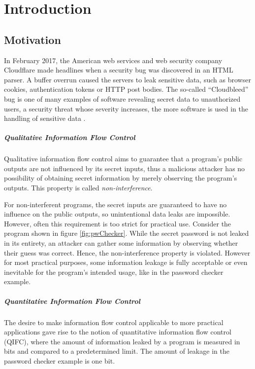 \chapter{Introduction}\label{sec:intro}

\section{Motivation}

In February 2017, the American web services and web security company Cloudflare made headlines when a security bug was discovered in an HTML parser. A buffer overrun caused the servers to leak sensitive data, such as browser cookies, authentication tokens or HTTP post bodies. The so-called \enquote{Cloudbleed} bug is one of many examples of software revealing secret data to unauthorized users, a security threat whose severity increases, the more software is used in the handling of sensitive data \cite{cloudbleedIssue, cloudbleedReport}. 

\paragraph{Qualitative Information Flow Control}
Qualitative information flow control aims to guarantee that a program's public outputs are not influenced by its secret inputs, thus a malicious attacker has no possibility of obtaining secret information by merely observing the program's outputs. This property is called \emph{non-interference}. 

For non-interferent programs, the secret inputs are guaranteed to have no influence on the public outputs, so unintentional data leaks are impossible. However, often this requirement is too strict for practical use. Consider the program shown in figure \ref{fig:pwChecker}. While the secret password is not leaked in its entirety, an attacker can gather some information by observing whether their guess was correct. Hence, the non-interference property is violated. However for most practical purposes, some information leakage is fully acceptable or even inevitable for the program's intended usage, like in the password checker example.

\paragraph{Quantitative Information Flow Control}
The desire to make information flow control applicable to more practical applications gave rise to the notion of quantitative information flow control (QIFC), where the amount of information leaked by a program is measured in bits and compared to a predetermined limit. The amount of leakage in the password checker example is one bit.

